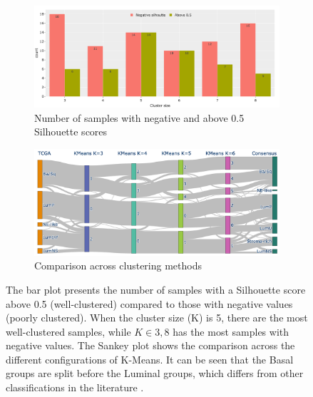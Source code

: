 \begin{figure}[!t]
    \centering
    \captionsetup{font=small} 
    \begin{subfigure}[!t]{0.9\textwidth}
        \includegraphics[width=\textwidth, keepaspectratio]{Sections/ClusteringAnalysis/Resources/cs_top3/sill_distrib/sill_neg_above_th.png}
        \caption{Number of samples with negative and above 0.5 Silhouette scores}
        \label{fig:cs:sill_neg_above_th}
    \end{subfigure}
    \centering
     \begin{subfigure}[!t]{0.9\textwidth}
        \includegraphics[width=\textwidth, keepaspectratio]{Sections/ClusteringAnalysis/Resources/cs_top3/sill_distrib/sky_kMeans.png}
        \caption{Comparison across clustering methods}
        \label{fig:cs:sankey_kMeans}
    \end{subfigure}
    \centering
    \caption[Mis-clustered samples overview]{The bar plot presents the number of samples with a Silhouette score above 0.5 (well-clustered) compared to those with negative values (poorly clustered). When the cluster size (K) is 5, there are the most well-clustered samples, while $K\in{3,8}$ has the most samples with negative values. The Sankey plot shows the comparison across the different configurations of K-Means. It can be seen that the Basal groups are split before the Luminal groups, which differs from other classifications in the literature \citep{Robertson2017-mg, Kamoun2020-tj}.}
    \label{fig:cs:sankey_comp}
\end{figure}


